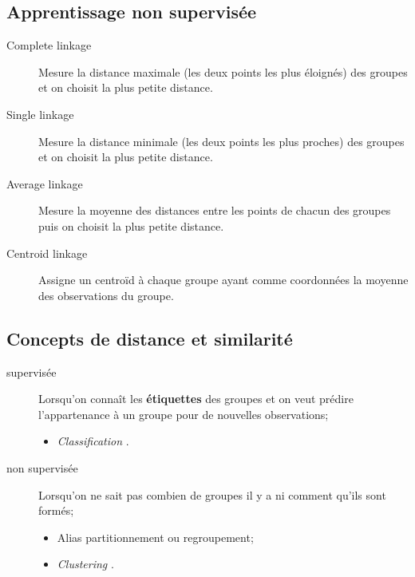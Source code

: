 \documentclass[10pt, french]{article}
\begin{document}
\begin{multicols*}{3}
\newpage

\section{Apprentissage non supervisée}

\begin{definitionNOHFILLsub}[Liaisons]
\begin{description}
	\item[Complete linkage]	Mesure la distance maximale (les deux points les plus éloignés) des groupes et on choisit la plus petite distance.
	\item[Single linkage]	Mesure la distance minimale (les deux points les plus proches) des groupes et on choisit la plus petite distance.
	\item[Average linkage]	Mesure la moyenne des distances entre les points de chacun des groupes puis on choisit la plus petite distance.
	\item[Centroid linkage]	Assigne un centroïd à chaque groupe ayant comme coordonnées la moyenne des observations du groupe.
\end{description}
\end{definitionNOHFILLsub}

\subsection*{Concepts de distance et similarité}

\begin{definitionNOHFILL}[Classification]
\begin{description}
	\item[supervisée]	Lorsqu'on connaît les \textbf{étiquettes} des groupes et on veut prédire l'appartenance à un groupe pour de nouvelles observations;
		\begin{itemize}[leftmargin = *] 
		\item	\og \textit{Classification} \fg{}.
		\end{itemize}
	\item[non supervisée]	Lorsqu'on ne sait pas combien de groupes il y a ni comment qu'ils sont formés;
		\begin{itemize}[leftmargin = *]
		\item	Alias partitionnement ou regroupement;
		\item	\og \textit{Clustering} \fg{}.
		\end{itemize}
\end{description}
\end{definitionNOHFILL}


\end{multicols*}
\end{document}
